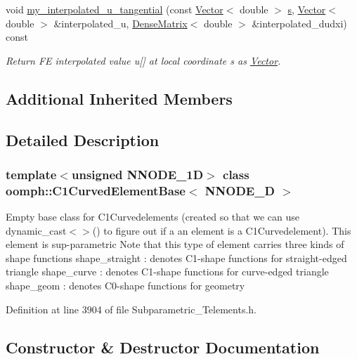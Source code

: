 \begin{DoxyCompactItemize}
\item 
void \hyperlink{classoomph_1_1C1CurvedElementBase_ac6b4ddc3a10424d88e278c1e260b5a10}{my\+\_\+interpolated\+\_\+u\+\_\+tangential} (const \hyperlink{classoomph_1_1Vector}{Vector}$<$ double $>$ \hyperlink{cfortran_8h_ab7123126e4885ef647dd9c6e3807a21c}{s}, \hyperlink{classoomph_1_1Vector}{Vector}$<$ double $>$ \&interpolated\+\_\+u, \hyperlink{classoomph_1_1DenseMatrix}{Dense\+Matrix}$<$ double $>$ \&interpolated\+\_\+dudxi) const
\begin{DoxyCompactList}\small\item\em Return FE interpolated value u\mbox{[}\mbox{]} at local coordinate s as \hyperlink{classoomph_1_1Vector}{Vector}. \end{DoxyCompactList}\end{DoxyCompactItemize}
\subsection*{Additional Inherited Members}


\subsection{Detailed Description}
\subsubsection*{template$<$unsigned N\+N\+O\+D\+E\+\_\+1D$>$\newline
class oomph\+::\+C1\+Curved\+Element\+Base$<$ N\+N\+O\+D\+E\+\_\+D $>$}

Empty base class for C1\+Curvedelements (created so that we can use dynamic\+\_\+cast$<$$>$() to figure out if a an element is a C1\+Curvedelement). This element is sup-\/parametric Note that this type of element carries three kinds of shape functions shape\+\_\+straight \+: denotes C1-\/shape functions for straight-\/edged triangle shape\+\_\+curve \+: denotes C1-\/shape functions for curve-\/edged triangle shape\+\_\+geom \+: denotes C0-\/shape functions for geometry 

Definition at line 3904 of file Subparametric\+\_\+\+Telements.\+h.



\subsection{Constructor \& Destructor Documentation}
\mbox{\label{classoomph_1_1C1CurvedElementBase_acf744418145e719529ce0f09746976d3}} 
